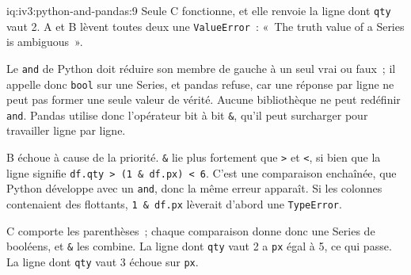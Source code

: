 \begin{solution}{iq:iv3:python-and-pandas:9}
Seule C fonctionne, et elle renvoie la ligne dont \texttt{qty} vaut 2. A et B lèvent toutes deux une \texttt{ValueError}~: «~The truth value of a Series is ambiguous~».

Le \texttt{and} de Python doit réduire son membre de gauche à un seul vrai ou faux~; il appelle donc \texttt{bool} sur une Series, et pandas refuse, car une réponse par ligne ne peut pas former une seule valeur de vérité. Aucune bibliothèque ne peut redéfinir \texttt{and}. Pandas utilise donc l'opérateur bit à bit \texttt{\&}, qu'il peut surcharger pour travailler ligne par ligne.

B échoue à cause de la priorité. \texttt{\&} lie plus fortement que \texttt{>} et \texttt{<}, si bien que la ligne signifie \texttt{df.qty > (1 \& df.px) < 6}. C'est une comparaison enchaînée, que Python développe avec un \texttt{and}, donc la même erreur apparaît. Si les colonnes contenaient des flottants, \texttt{1 \& df.px} lèverait d'abord une \texttt{TypeError}.

C comporte les parenthèses~; chaque comparaison donne donc une Series de booléens, et \texttt{\&} les combine. La ligne dont \texttt{qty} vaut 2 a \texttt{px} égal à 5, ce qui passe. La ligne dont \texttt{qty} vaut 3 échoue sur \texttt{px}.

\end{solution}


